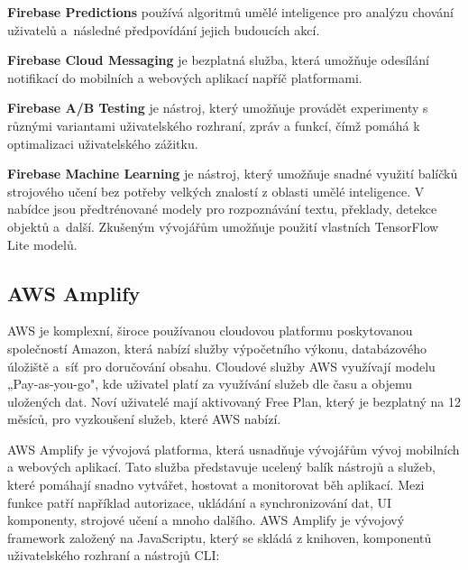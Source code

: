 \documentclass[czech, bc, kiv, he, iso690numb]{fasthesis}
\begin{document}
\vspace{0.1cm}
\noindent \textbf{Firebase Predictions} používá algoritmů umělé inteligence pro analýzu chování uživatelů a~následné předpovídání jejich budoucích akcí.

\vspace{0.1cm}
\noindent \textbf{Firebase Cloud Messaging} je bezplatná služba, která umožňuje odesílání notifikací do mobilních a webových aplikací napříč platformami.

\vspace{0.1cm}
\noindent \textbf{Firebase A/B Testing} je nástroj, který umožňuje provádět experimenty s různými variantami uživatelského rozhraní, zpráv a funkcí, čímž pomáhá k optimalizaci uživatelského zážitku.

\vspace{0.1cm}
\noindent \textbf{Firebase Machine Learning} je nástroj, který umožňuje snadné využití balíčků strojového učení bez potřeby velkých znalostí z oblasti umělé inteligence. V nabídce jsou předtrénované modely pro rozpoznávání textu, překlady, detekce objektů a~další. Zkušeným vývojářům umožňuje použití vlastních TensorFlow Lite modelů. 




\subsection{AWS Amplify}

\gls{AWS} je komplexní, široce používanou cloudovou platformu poskytovanou společností Amazon, která nabízí služby výpočetního výkonu, databázového úložiště a~síť pro doručování obsahu. Cloudové služby \gls{AWS} využívají modelu „Pay-as-you-go", kde uživatel platí za využívání služeb dle času a objemu uložených dat. Noví uživatelé mají aktivovaný Free Plan, který je bezplatný na 12 měsíců, pro vyzkoušení služeb, které \gls{AWS} nabízí. \cite{techtarget_AWS} \cite{Amazon_web_service} 

\gls{AWS} Amplify je vývojová platforma, která usnadňuje vývojářům vývoj mobilních a webových aplikací. Tato služba představuje ucelený balík nástrojů a služeb, které pomáhají snadno vytvářet, hostovat a monitorovat běh aplikací. Mezi funkce patří například autorizace, ukládání a synchronizování dat, \gls{UI} komponenty, strojové učení a mnoho dalšího. \gls{AWS} Amplify je vývojový framework založený na JavaScriptu, který se skládá z knihoven, komponentů uživatelského rozhraní a nástrojů \gls{CLI}: \cite{aws-amplify-docs} \cite{javapoint-aws-amplify}   
\end{document}
